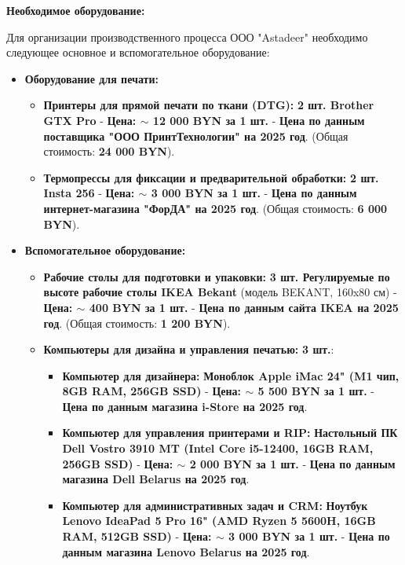 \textbf{Необходимое оборудование:}

Для организации производственного процесса ООО "Astadeer" необходимо следующее основное и вспомогательное оборудование:

\begin{itemize}
    \item \textbf{Оборудование для печати:}
        \begin{itemize}
            \item \textbf{Принтеры для прямой печати по ткани (DTG):} \textbf{2 шт. Brother GTX Pro} -  \textbf{Цена:  $\sim$ 12 000 BYN за 1 шт.} - \textbf{Цена по данным поставщика "ООО ПринтТехнологии" на 2025 год}.  (Общая стоимость: \textbf{24 000 BYN}).
            \item \textbf{Термопрессы для фиксации и предварительной обработки:} \textbf{2 шт. Insta 256} - \textbf{Цена: $\sim$ 3 000 BYN за 1 шт.} - \textbf{Цена по данным интернет-магазина "ФорДА" на 2025 год}. (Общая стоимость: \textbf{6 000 BYN}).
        \end{itemize}
    \item \textbf{Вспомогательное оборудование:}
        \begin{itemize}
            \item \textbf{Рабочие столы для подготовки и упаковки:} \textbf{3 шт. Регулируемые по высоте рабочие столы IKEA Bekant} (модель BEKANT, 160x80 см) - \textbf{Цена: $\sim$ 400 BYN за 1 шт.} - \textbf{Цена по данным сайта IKEA на 2025 год}. (Общая стоимость: \textbf{1 200 BYN}).
            \item \textbf{Компьютеры для дизайна и управления печатью:} \textbf{3 шт.}:
                \begin{itemize}
                    \item \textbf{Компьютер для дизайнера:} \textbf{Моноблок Apple iMac 24" (M1 чип, 8GB RAM, 256GB SSD)} - \textbf{Цена: $\sim$ 5 500 BYN за 1 шт.} - \textbf{Цена по данным магазина i-Store на 2025 год}.
                    \item \textbf{Компьютер для управления принтерами и RIP:} \textbf{Настольный ПК Dell Vostro 3910 MT (Intel Core i5-12400, 16GB RAM, 256GB SSD)} - \textbf{Цена: $\sim$ 2 000 BYN за 1 шт.} - \textbf{Цена по данным магазина Dell Belarus на 2025 год}.
                    \item \textbf{Компьютер для административных задач и CRM:} \textbf{Ноутбук Lenovo IdeaPad 5 Pro 16" (AMD Ryzen 5 5600H, 16GB RAM, 512GB SSD)} - \textbf{Цена: $\sim$ 3 000 BYN за 1 шт.} - \textbf{Цена по данным магазина Lenovo Belarus на 2025 год}.

\end{itemize}
\end{itemize}
\end{itemize}
